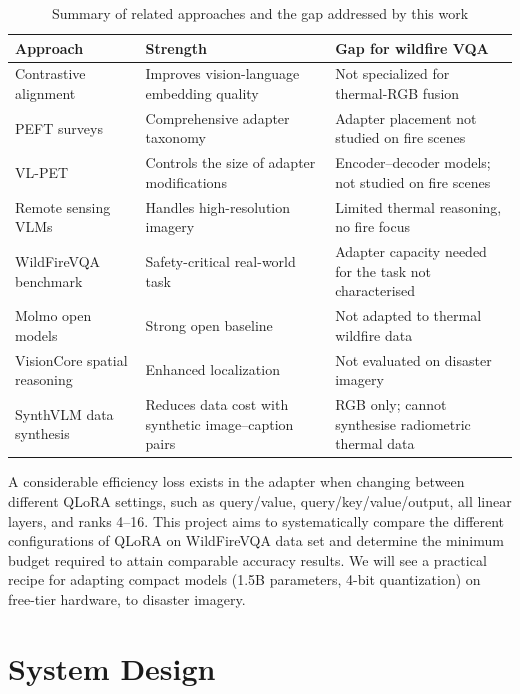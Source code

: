 \documentclass[conference]{IEEEtran}
\begin{document}
\begin{table}[t]
\centering
\caption{Summary of related approaches and the gap addressed by this work}
\label{tab:related}
\footnotesize
\setlength{\tabcolsep}{3pt}
\begin{tabular}{@{}P{0.26\columnwidth}P{0.33\columnwidth}P{0.35\columnwidth}@{}}
\toprule
\textbf{Approach} & \textbf{Strength} & \textbf{Gap for wildfire VQA} \\
\midrule

Contrastive alignment \cite{ak2024aligning} & Improves vision-language embedding quality & Not specialized for thermal-RGB fusion \\
PEFT surveys \cite{peft2024survey} & Comprehensive adapter taxonomy & Adapter placement not studied on fire scenes \\
VL-PET \cite{vlpet2024} & Controls the size of adapter modifications & Encoder--decoder models; not studied on fire scenes \\
Remote sensing VLMs \cite{remotesensing2024} & Handles high-resolution imagery & Limited thermal reasoning, no fire focus \\
WildFireVQA benchmark \cite{wildfirevqa} & Safety-critical real-world task & Adapter capacity needed for the task not characterised \\
Molmo open models \cite{molmo2024} & Strong open baseline & Not adapted to thermal wildfire data \\
VisionCore spatial reasoning \cite{visioncore2024} & Enhanced localization & Not evaluated on disaster imagery \\
SynthVLM data synthesis \cite{synthvlm2024} & Reduces data cost with synthetic image--caption pairs & RGB only; cannot synthesise radiometric thermal data \\
\bottomrule
\end{tabular}
\end{table}

A considerable efficiency loss exists in the adapter when changing between different QLoRA settings, such as query/value, query/key/value/output, all linear layers, and ranks 4--16. This project aims to systematically compare the different configurations of QLoRA on WildFireVQA data set and determine the minimum budget required to attain comparable accuracy results. We will see a practical recipe for adapting compact models (1.5B parameters, 4-bit quantization) on free-tier hardware, to disaster imagery.

\section{System Design}
\end{document}
